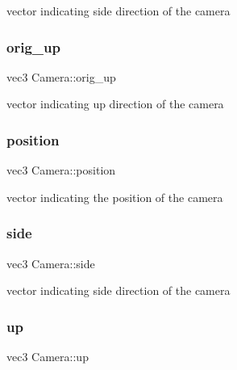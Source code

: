 vector indicating side direction of the camera 

\mbox{\label{classCamera_a526c419473d3a8a22011644399520d9a}} 
\subsubsection{\texorpdfstring{orig\+\_\+up}{orig\_up}}
{\footnotesize\ttfamily vec3 Camera\+::orig\+\_\+up\hspace{0.3cm}{\ttfamily [private]}}



vector indicating up direction of the camera 

\mbox{\label{classCamera_a6bd96884fb5fb652b71042f2d7f0122c}} 
\subsubsection{\texorpdfstring{position}{position}}
{\footnotesize\ttfamily vec3 Camera\+::position\hspace{0.3cm}{\ttfamily [private]}}



vector indicating the position of the camera 

\mbox{\label{classCamera_a933d8f284b441a9baf9357a597006b12}} 
\subsubsection{\texorpdfstring{side}{side}}
{\footnotesize\ttfamily vec3 Camera\+::side\hspace{0.3cm}{\ttfamily [private]}}



vector indicating side direction of the camera 

\mbox{\label{classCamera_aff4fd1aa62994840f7742b698f15313e}} 
\subsubsection{\texorpdfstring{up}{up}}
{\footnotesize\ttfamily vec3 Camera\+::up\hspace{0.3cm}{\ttfamily [private]}}




